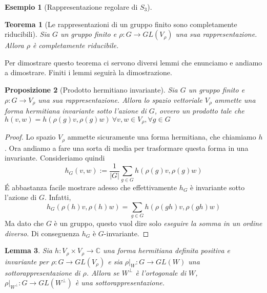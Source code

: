 \documentclass[11pt]{article}
\theoremstyle{plain}
\newtheorem{thm}{Teorema}[section]
\newtheorem{lemma}[thm]{Lemma}
\newtheorem{prop}[thm]{Proposizione}
\theoremstyle{definition}
\newtheorem{exmp}{Esempio}[section]
\theoremstyle{remark}
\newcommand{\C}{\mathbb{C}}
\newcommand{\dsum}{\displaystyle\sum}
\begin{document}
\begin{exmp}[Rappresentazione regolare di $S_3$]


\end{exmp}



\begin{thm}[Le rappresentazioni di un gruppo finito sono completamente riducibili]
  Sia $G$ un gruppo finito e $\rho: G \to GL(V_\rho)$ una sua rappresentazione. Allora $\rho$ è completamente riducibile.
  \label{thm:gruppo finito completamente riducibile}
\end{thm}
Per dimostrare questo teorema ci servono diversi lemmi che enunciamo e andiamo a dimostrare. Finiti i lemmi seguirà la dimostrazione.


\begin{prop}[Prodotto hermitiano invariante] Sia $G$ un gruppo finito e $\rho: G \to V_\rho$ una sua rappresentazione. Allora lo spazio vettoriale $V_\rho$ ammette una forma hermitiana invariante sotto l'azione di $G$, ovvero un prodotto tale che $h(v,w) = h(\rho(g) v, \rho(g) w) \ \forall v,w\in V_\rho, \forall g \in G$
\label{thm:esistenza hermitiana}
\end{prop}

\begin{proof}

Lo spazio $V_\rho$ ammette sicuramente una forma hermitiana, che chiamiamo $h$. Ora andiamo a fare una sorta di media per trasformare questa forma in una invariante. Consideriamo quindi
\[h_G(v, w) := \dfrac{1}{|G|} \dsum_{g \in G} h(\rho(g)v,\rho(g) w) \]
\'E abbastanza facile mostrare adesso che effettivamente $h_G$ è invariante sotto l'azione di $G$. Infatti,
\[ h_G(\rho(h)v, \rho(h) w) = \dsum_{g \in G} h(\rho(gh)v , \rho(gh) w)\]
Ma dato che $G$ è un gruppo, questo vuol dire solo \emph{eseguire la somma in un ordine diverso.} Di conseguenza $h_G$ è $G$-invariante.
\end{proof}


\begin{lemma}
Sia $h: V_\rho \times V_\rho \to \C$ una forma hermitiana definita positiva e invariante per $\rho: G \to GL(V_\rho)$ e sia $\rho|_W: G \to GL(W)$ una sottorappresentazione di $\rho$. Allora se $W^\perp$ è l'ortogonale di $W$, $\rho|_{W^\perp}: G \to GL(W^\perp)$ è una sottorappresentazione.

\end{lemma}
\end{document}

